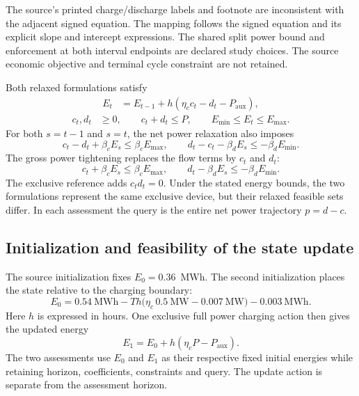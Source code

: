 The source's printed charge/discharge labels and footnote are inconsistent
with the adjacent signed equation. The mapping follows the signed equation
and its explicit slope and intercept expressions. The shared split power
bound and enforcement at both interval endpoints are declared study choices.
The source economic objective and terminal cycle constraint are not retained.

Both relaxed formulations satisfy
\begin{equation}\begin{aligned}
E_t&=E_{t-1}+h(\eta_c c_t-d_t-P_{\mathrm{aux}}),\label{eq:internal_dynamics}\end{aligned}\end{equation}
\begin{equation}\begin{aligned}
c_t, d_t&\geq 0,\qquad c_t+d_t\leq P,\qquad
 E_{\min}\leq E_t\leq E_{\max}.\label{eq:internal_box}
\end{aligned}\end{equation}
For both $s=t-1$ and $s=t$, the net power relaxation also imposes
\begin{equation}
c_t-d_t+\beta_cE_s\leq\beta_cE_{\max},\qquad
d_t-c_t-\beta_dE_s\leq-\beta_dE_{\min}.\label{eq:internal_net}
\end{equation}
The gross power tightening replaces the flow terms by $c_t$ and $d_t$:
\begin{equation}
c_t+\beta_cE_s\leq\beta_cE_{\max},\qquad
d_t-\beta_dE_s\leq-\beta_dE_{\min}.\label{eq:internal_gross}
\end{equation}
The exclusive reference adds $c_td_t=0$. Under the stated energy bounds,
the two formulations represent the same exclusive device, but their
relaxed feasible sets differ. In each assessment the query is the entire
net power trajectory $p=d-c$.

\subsection{Initialization and feasibility of the state update}
The source initialization fixes $E_0=0.36$~MWh. The second initialization
places the state relative to the charging boundary:
\begin{equation}
E_0=0.54~\mathrm{MWh}
-Th\bigl(\eta_c\,0.5~\mathrm{MW}-0.007~\mathrm{MW}\bigr)
-0.003~\mathrm{MWh}.\label{eq:initialization}
\end{equation}
Here $h$ is expressed in hours. One exclusive full power charging action
then gives the updated energy
\begin{equation}
E_1=E_0+h(\eta_cP-P_{\mathrm{aux}}).\label{eq:update}
\end{equation}
The two assessments use $E_0$ and $E_1$ as their respective fixed initial
energies while retaining horizon, coefficients, constraints and query.
The update action is separate from the assessment horizon.

